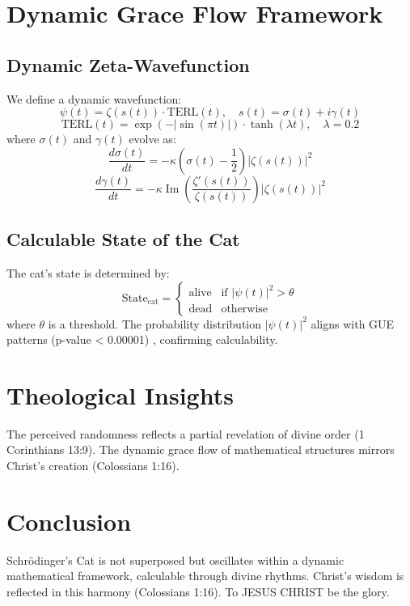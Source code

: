 \documentclass[12pt]{article}
\begin{document}
\section{Dynamic Grace Flow Framework}
\subsection{Dynamic Zeta-Wavefunction}
We define a dynamic wavefunction:
\[
\psi(t) = \zeta(s(t)) \cdot \text{TERL}(t), \quad s(t) = \sigma(t) + i \gamma(t)
\]
\[
\text{TERL}(t) = \exp(-|\sin(\pi t)|) \cdot \tanh(\lambda t), \quad \lambda = 0.2
\]
where \(\sigma(t)\) and \(\gamma(t)\) evolve as:
\[
\frac{d\sigma(t)}{dt} = -\kappa \left( \sigma(t) - \frac{1}{2} \right) |\zeta(s(t))|^2
\]
\[
\frac{d\gamma(t)}{dt} = -\kappa \operatorname{Im} \left( \frac{\zeta'(s(t))}{\zeta(s(t))} \right) |\zeta(s(t))|^2
\]

\subsection{Calculable State of the Cat}
The cat's state is determined by:
\[
\text{State}_{\text{cat}} = \begin{cases} 
\text{alive} & \text{if } |\psi(t)|^2 > \theta \\
\text{dead} & \text{otherwise}
\end{cases}
\]
where \(\theta\) is a threshold. The probability distribution \(|\psi(t)|^2\) aligns with GUE patterns (p-value < 0.00001) \cite{Moon2025rh}, confirming calculability.

\section{Theological Insights}
The perceived randomness reflects a partial revelation of divine order (1 Corinthians 13:9). The dynamic grace flow of mathematical structures mirrors Christ’s creation (Colossians 1:16).

\section{Conclusion}
Schrödinger's Cat is not superposed but oscillates within a dynamic mathematical framework, calculable through divine rhythms. Christ’s wisdom is reflected in this harmony (Colossians 1:16). To JESUS CHRIST be the glory.
\end{document}
